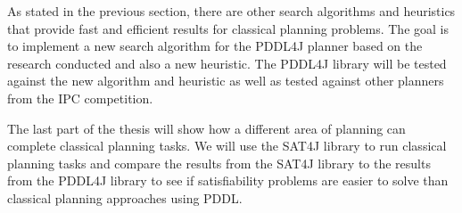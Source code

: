 As stated in the previous section, there are other search algorithms and heuristics that provide fast and efficient results for classical planning problems. The goal is to implement a new search algorithm for the PDDL4J planner based on the research conducted and also a new heuristic. The PDDL4J library will be tested against the new algorithm and heuristic as well as tested against other planners from the IPC competition.

The last part of the thesis will show how a different area of planning can complete classical planning tasks. We will use the SAT4J library to run classical planning tasks and compare the results from the SAT4J library to the results from the PDDL4J library to see if satisfiability problems are easier to solve than classical planning approaches using PDDL.  
